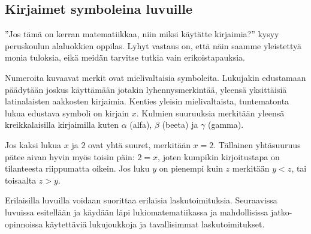 \subsection*{Kirjaimet symboleina luvuille}

''Jos tämä on kerran matematiikkaa, niin miksi käytätte kirjaimia?'' kysyy peruskoulun alaluokkien oppilas. Lyhyt vastaus on, että näin saamme yleistettyä monia tuloksia, eikä meidän tarvitse tutkia vain erikoistapauksia.

Numeroita kuvaavat merkit ovat mielivaltaisia symboleita. Lukujakin edustamaan päädytään joskus käyttämään jotakin lyhennysmerkintää, yleensä yksittäisiä latinalaisten aakkosten kirjaimia. Kenties yleisin mielivaltaista, tuntematonta lukua edustava symboli on kirjain $x$. Kulmien suuruuksia merkitään yleensä kreikkalaisilla kirjaimilla kuten $\alpha$ (alfa), $\beta$ (beeta) ja $\gamma$ (gamma).

Jos kaksi lukua $x$ ja $2$ ovat yhtä suuret, merkitään
$x=2$. Tällainen yhtäsuuruus pätee aivan hyvin myös toisin päin: $2=x$, joten kumpikin kirjoitustapa on tilanteesta riippumatta oikein. Jos luku $y$ on pienempi kuin $z$ merkitään $y<z$, tai toisaalta $z>y$.


Erilaisilla luvuilla voidaan suorittaa erilaisia laskutoimituksia. Seuraavissa luvuissa esitellään ja käydään läpi lukiomatematiikassa ja mahdollisissa jatko-opinnoissa käytettäviä lukujoukkoja ja tavallisimmat laskutoimitukset.
